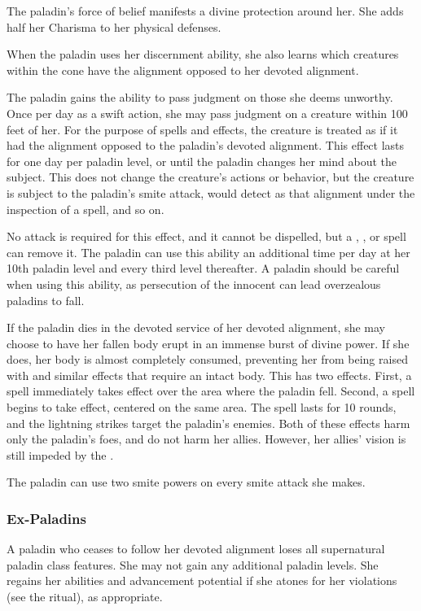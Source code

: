  The paladin's force of belief manifests a divine protection around her. She adds half her Charisma to her physical defenses.

 When the paladin uses her discernment ability, she also learns which creatures within the cone have the alignment opposed to her devoted alignment.

 The paladin gains the ability to pass judgment on those she deems unworthy. Once per day as a swift action, she may pass judgment on a creature within 100 feet of her. For the purpose of spells and effects, the creature is treated as if it had the alignment opposed to the paladin's devoted alignment. This effect lasts for one day per paladin level, or until the paladin changes her mind about the subject. This does not change the creature's actions or behavior, but the creature is subject to the paladin's smite attack, would detect as that alignment under the inspection of a  spell, and so on.

No attack is required for this effect, and it cannot be dispelled, but a , , or  spell can remove it. The paladin can use this ability an additional time per day at her 10th paladin level and every third level thereafter. A paladin should be careful when using this ability, as persecution of the innocent can lead overzealous paladins to fall.

 If the paladin dies in the devoted service of her devoted alignment, she may choose to have her fallen body erupt in an immense burst of divine power. If she does, her body is almost completely consumed, preventing her from being raised with  and similar effects that require an intact body. This has two effects. First, a  spell immediately takes effect over the area where the paladin fell. Second, a  spell begins to take effect, centered on the same area. The spell lasts for 10 rounds, and the lightning strikes target the paladin's enemies. Both of these effects harm only the paladin's foes, and do not harm her allies. However, her allies' vision is still impeded by the .

 The paladin can use two smite powers on every smite attack she makes.

\subsubsection{Ex-Paladins}
A paladin who ceases to follow her devoted alignment loses all supernatural paladin class features. She may not gain any additional paladin levels. She regains her abilities and advancement potential if she atones for her violations (see the  ritual), as appropriate.

